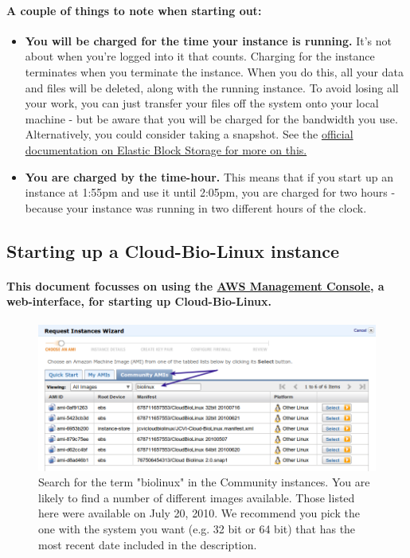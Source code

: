 \paragraph{A couple of things to note when starting out:}
\begin{itemize}
\item \textbf{You will be charged for the time your instance is running.} It's not about when you're logged into it that counts. Charging for the instance terminates when you terminate the instance. When you do this, all your data and files will be deleted, along with the running instance. To avoid losing all your work, you can just transfer your files off the system onto your local machine - but be aware that you will be charged for the bandwidth you use. Alternatively, you could consider taking a snapshot. See the \href{http://aws.amazon.com/ebs/}{official documentation on Elastic Block Storage for more on this.} 
\item \textbf{You are charged by the time-hour.} This means that if you start up an instance at 1:55pm and use it until 2:05pm, you are charged for two hours - because your instance was running in two different hours of the clock. 

\end{itemize}

\subsection{Starting up a Cloud-Bio-Linux instance}
\paragraph{This document focusses on using the \href{http://console.aws.amazon.com/ec2/home}{AWS Management Console}, a web-interface, for starting up Cloud-Bio-Linux.}

\begin{figure}[!hd]	\fbox
	{
		\begin{minipage}{13cm}
\includegraphics[width=\maxwidth]{"images/requestInstance"}
\caption[Start an Instance]{\label{fig:requestInstance}Search for the term "biolinux" in the Community instances. You are likely to find a number of different images available. Those listed here were available on July 20, 2010. We recommend you pick the one with the system you want (e.g. 32 bit or 64 bit) that has the most recent date included in the description.}
		\end{minipage}
	}
\end{figure}

